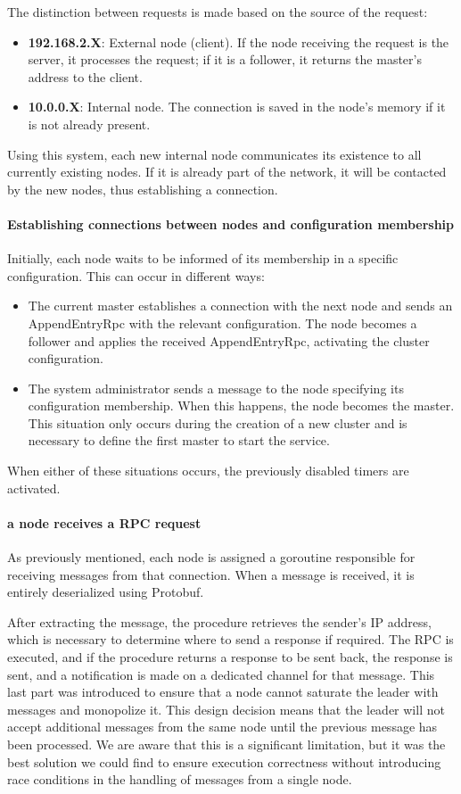 The distinction between requests is made based on the source of the request:
\begin{itemize}
  \item \textbf{192.168.2.X}: External node (client). If the node receiving the request is 
    the server, it processes the request; if it is a follower, it returns the master's 
    address to the client.
  \item \textbf{10.0.0.X}: Internal node. The connection is saved in the node's memory 
    if it is not already present.
\end{itemize}
Using this system, each new internal node communicates its existence to all currently 
existing nodes. If it is already part of the network, it will be contacted by the new nodes, 
thus establishing a connection.

\paragraph{Establishing connections between nodes and configuration membership}
Initially, each node waits to be informed of its membership in a specific configuration. 
This can occur in different ways:
\begin{itemize}
  \item The current master establishes a connection with the next node and sends an 
    AppendEntryRpc with the relevant configuration. The node becomes a follower and 
    applies the received AppendEntryRpc, activating the cluster configuration.
  \item The system administrator sends a message to the node specifying its 
    configuration membership. When this happens, the node becomes the master. 
    This situation only occurs during the creation of a new cluster and is necessary 
    to define the first master to start the service.
\end{itemize}
When either of these situations occurs, the previously disabled timers are activated.

\paragraph{a node receives a RPC request}
As previously mentioned, each node is assigned a goroutine responsible for receiving 
messages from that connection. When a message is received, it is entirely deserialized 
using Protobuf.

After extracting the message, the procedure retrieves the sender's IP address, which 
is necessary to determine where to send a response if required. The RPC is executed, 
and if the procedure returns a response to be sent back, the response is sent, and a 
notification is made on a dedicated channel for that message.
This last part was introduced to ensure that a node cannot saturate the leader with 
messages and monopolize it. This design decision means that the leader will not accept 
additional messages from the same node until the previous message has been processed. 
We are aware that this is a significant limitation, but it was the best solution we 
could find to ensure execution correctness without introducing race conditions in the 
handling of messages from a single node.

